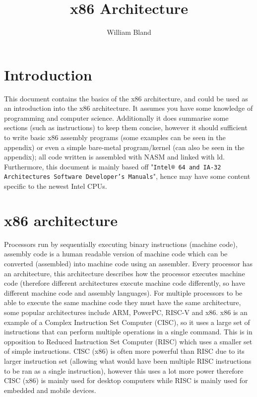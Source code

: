 \documentclass{article}
\title{\textbf{x86 Architecture}}
\author{William Bland}
\newcommand{\layout}[1]{\parbox{\linewidth}{#1}}
\begin{document}
\maketitle
\tableofcontents
\newpage

\nocite{*}

\layout{
  \section{Introduction}

  This document contains the basics of the x86 architecture, and could be used as an introduction into the x86 architecture.
  It assumes you have some knowledge of programming and computer science.
  Additionally it does summarise some sections (such as instructions) to keep them concise, however it should sufficient to write basic x86 assembly programs (some examples can be seen in the appendix) or even a simple bare-metal program/kernel (can also be seen in the appendix);
  all code written is assembled with NASM and linked with ld.
  Furthermore, this document is mainly based off "\texttt{Intel® 64 and IA-32 Architectures Software Developer’s Manuals}", hence may have some content specific to the newest Intel CPUs.
}

\layout{
  \section{x86 architecture}

  Processors run by sequentially executing binary instructions (machine code),
  assembly code is a human readable version of machine code which can be converted (assembled) into machine code using an assembler.
  Every processor has an architecture, this architecture describes how the processor executes machine code (therefore different architectures execute machine code differently, so have different machine code and assembly languages).
  For multiple processors to be able to execute the same machine code they must have the same architecture, some popular architectures include ARM, PowerPC, RISC-V and x86.
  x86 is an example of a Complex Instruction Set Computer (CISC), so it uses a large set of instructions that can perform multiple operations in a single command.
  This is in opposition to Reduced Instruction Set Computer (RISC) which uses a smaller set of simple instructions.
  CISC (x86) is often more powerful than RISC due to its larger instruction set (allowing what would have been multiple RISC instructions to be ran as a single instruction), however this uses a lot more power therefore CISC (x86) is mainly used for desktop computers while RISC is mainly used for embedded and mobile devices.
}
\end{document}
